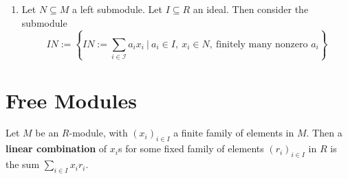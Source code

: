 \documentclass{article}
\begin{document}
\begin{enumerate}
         \begin{proof}
            Consider two functions $f: M_1 \to (M_1 + M_2)/M_2$ and $g: M_1 \to M_1\cap M_2$. Attempt to show this via applying the first isomorphism theorem. Consider the following diagram:
            \begin{figure}[htbp]
                \centering
            \end{figure}

            In order to apply the first isomorphism theorem, it suffices to show that $M_1 \cap M_2 = \ker f$: as then the universal property grants the existence of such $h$, which allows the application of the First Isomorphism Theorem. This is indeed the case, as
            \begin{itemize}
                \item $M_1 \cap M_2 \subseteq \ker f$, as $M_1 \cap M_2 \subseteq M_2$ which is mapped to 0 by $f$.
                \item $M_1 \cap M_2 \supseteq \ker f$. For all $x\in \ker f$, by hypothesis $x\in M_1$; and the only elements that are annihilated by the quotient are those in $M_2$.
            \end{itemize}
        \end{proof}
    \item Let $N\subseteq M$ a left submodule. Let $I\subseteq R$ an ideal. Then consider the submodule
         \[
             IN := \left\{ IN := \sum\limits_{i\in\mathcal{I}} a_i x_i\ \Big|\ a_i \in I,\ x_i\in N,\ \text{finitely many nonzero } a_i \right\}
         \]
\end{enumerate}

\section{Free Modules}

\begin{definition}
    Let $M$ be an $R$-module, with $(x_i)_{i\in I}$ a finite family of elements in $M$. Then a \textbf{linear combination} of $x_i$s for some fixed family of elements $(r_i)_{i\in I}$ in $R$ is the sum $\sum\limits_{i\in I} x_i r_i$.
\end{definition}
\end{document}

